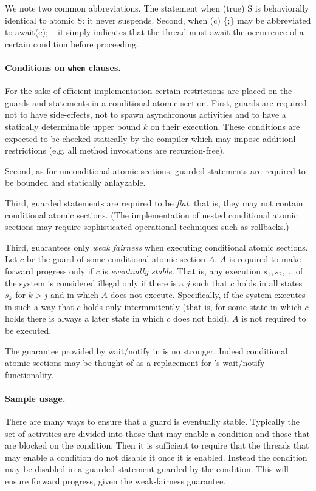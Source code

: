 {{We note two common abbreviations. The statement {\cf when (true) S} is
behaviorally identical to {\cf atomic S}: it never suspends. Second,
{\cf when (c) \{;\}} may be abbreviated to {\cf await(c);} -- it
simply indicates that the thread must await the occurrence of a
certain condition before proceeding.  

\paragraph{Conditions on {\tt when} clauses.} 

For the sake of efficient implementation certain restrictions are
placed on the guards and statements in a conditional atomic
section. First, guards are required not to have side-effects, not to
spawn asynchronous activities and to have a statically determinable
upper bound $k$ on their execution. These conditions are expected to
be checked statically by the compiler which may impose additionl
restrictions (e.g.{} all method invocations are recursion-free).

Second, as for unconditional atomic sections, guarded statements are
required to be bounded and statically anlayzable.

Third, guarded statements are required to be {\em flat}, that is, they
may not contain conditional atomic sections. (The implementation of
nested conditional atomic sections may require sophisticated
operational techniques such as rollbacks.)

Third, \Xten{} guarantees only {\em weak fairness} when executing
conditional atomic sections. Let $c$ be the guard of some conditional
atomic section $A$. $A$ is required to make forward progress only if
$c$ is {\em eventually stable}. That is, any execution $s_1, s_2,
\ldots$ of the system is considered illegal only if there is a $j$
such that $c$ holds in all states $s_k$ for $k > j$ and in which $A$
does not execute. Specifically, if the system executes in such a way
that $c$ holds only intermmitently (that is, for some state in which
$c$ holds there is always a later state in which $c$ does not hold),
$A$ is not required to be executed.

\begin{rationale}
The guarantee provided by {\cf wait/notify} in \java{} is no
stronger. Indeed conditional atomic sections may be thought of as a
replacement for \java's wait/notify functionality.
\end{rationale} 

\paragraph{Sample usage.} 
There are many ways to ensure that a guard is eventually
stable. Typically the set of activities are divided into those that
may enable a condition and those that are blocked on the
condition. Then it is sufficient to require that the threads that may
enable a condition do not disable it once it is enabled. Instead the
condition may be disabled in a guarded statement guarded by the
condition. This will ensure forward progress, given the weak-fairness
guarantee.

}}
